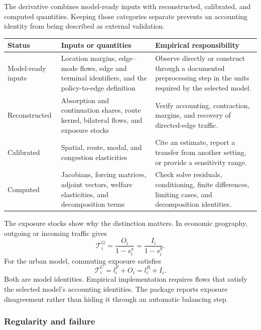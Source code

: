 The derivative combines model-ready inputs with reconstructed, calibrated, and
computed quantities. Keeping those categories separate prevents an accounting
identity from being described as external validation.
\begin{longtable}{L{0.20\textwidth}L{0.34\textwidth}L{0.36\textwidth}}
\toprule
Status & Inputs or quantities & Empirical responsibility \\
\midrule
\endhead
Model-ready inputs &
Location margins, edge--mode flows, edge and terminal identifiers, and the
policy-to-edge definition &
Observe directly or construct through a documented preprocessing step in the
units required by the selected model. \\
Reconstructed &
Absorption and continuation shares, route kernel, bilateral flows, and exposure
stocks &
Verify accounting, contraction, margins, and recovery of directed-edge
traffic. \\
Calibrated &
Spatial, route, modal, and congestion elasticities &
Cite an estimate, report a transfer from another setting, or provide a
sensitivity range. \\
Computed &
Jacobians, forcing matrices, adjoint vectors, welfare elasticities, and
decomposition terms &
Check solve residuals, conditioning, finite differences, limiting cases, and
decomposition identities. \\
\bottomrule
\end{longtable}

The exposure stocks show why the distinction matters. In economic
geography, outgoing or incoming traffic gives
\[
 \mathcal T_i^G=\frac{O_i}{1-s_i^x}
               =\frac{I_i}{1-s_i^y}.
\]
For the urban model, commuting exposure satisfies
\[
 \mathcal T_i^U=l_i^F+O_i=l_i^R+I_i.
\]
Both are model identities. Empirical implementation requires flows that satisfy
the selected model's accounting identities. The package reports exposure disagreement
rather than hiding it through an automatic balancing step.


\subsubsection{Regularity and failure}

